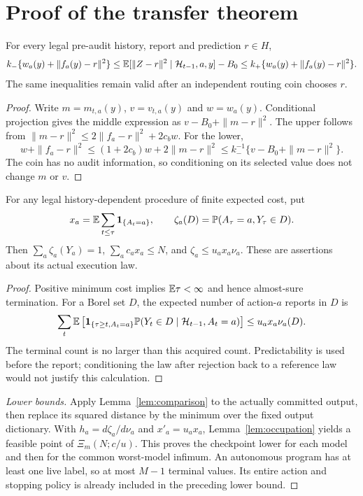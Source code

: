 \section{Proof of the transfer theorem}
\begin{lemma}\label{lem:comparison}
For every legal pre-audit history, report and prediction $r\in H$,
\[
 k_-\{w_a(y)+\|f_a(y)-r\|^2\}
 \le \mathbb E[\|Z-r\|^2\mid\mathcal H_{t-1},a,y]-B_0
 \le k_+\{w_a(y)+\|f_a(y)-r\|^2\}.
\]
The same inequalities remain valid after an independent routing coin chooses $r$.
\end{lemma}
\begin{proof}
Write $m=m_{t,a}(y)$, $v=v_{t,a}(y)$ and $w=w_a(y)$. Conditional projection gives the middle expression as $v-B_0+\|m-r\|^2$. The upper follows from
$\|m-r\|^2\le2\|f_a-r\|^2+2c_bw$.
For the lower,
\[
 w+\|f_a-r\|^2\le(1+2c_b)w+2\|m-r\|^2
 \le k_-^{-1}\{v-B_0+\|m-r\|^2\}.
\]
The coin has no audit information, so conditioning on its selected value does not change $m$ or $v$.
\end{proof}

\begin{lemma}\label{lem:occupation}
For any legal history-dependent procedure of finite expected cost, put
\[
 x_a=\mathbb E\sum_{t\le\tau}\mathbf1_{\{A_t=a\}},\qquad
 \zeta_a(D)=\mathbb P(A_\tau=a,Y_\tau\in D).
\]
Then $\sum_a\zeta_a(Y_a)=1$, $\sum_ac_ax_a\le N$, and
$\zeta_a\le u_ax_a\nu_a$. These are assertions about its actual execution law.
\end{lemma}
\begin{proof}
Positive minimum cost implies $\mathbb E\tau<\infty$ and hence almost-sure termination. For a Borel set $D$, the expected number of action-$a$ reports in $D$ is
\[
 \sum_t\mathbb E\left[\mathbf1_{\{\tau\ge t,A_t=a\}}
       \mathbb P(Y_t\in D\mid\mathcal H_{t-1},A_t=a)\right]
 \le u_ax_a\nu_a(D).
\]
The terminal count is no larger than this acquired count. Predictability is used before the report; conditioning the law after rejection back to a reference law would not justify this calculation.
\end{proof}

\begin{proof}[Lower bounds]
Apply Lemma~\ref{lem:comparison} to the actually committed output, then replace its squared distance by the minimum over the fixed output dictionary. With $h_a=d\zeta_a/d\nu_a$ and $x'_a=u_ax_a$, Lemma~\ref{lem:occupation} yields a feasible point of $\Xi_m(N;c/u)$. This proves the checkpoint lower for each model and then for the common worst-model infimum. An autonomous program has at least one live label, so at most $M-1$ terminal values. Its entire action and stopping policy is already included in the preceding lower bound.
\end{proof}

